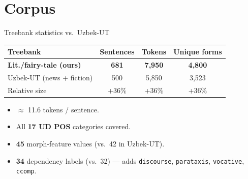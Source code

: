 \documentclass[10pt,aspectratio=169]{beamer}
\begin{document}
\section{Corpus}
\begin{frame}{Treebank statistics vs.\ Uzbek-UT}
   \centering
   \begin{tabular}{lccc}
      \toprule
      \textbf{Treebank} & \textbf{Sentences} & \textbf{Tokens} & \textbf{Unique forms}\\
      \midrule
      \textbf{Lit./fairy-tale (ours)} & \textbf{681}  & \textbf{7{,}950} & \textbf{4{,}800}\\
      Uzbek-UT (news + fiction)       & 500           & 5{,}850          & 3{,}523\\
      \midrule
      Relative size                   & +36\%         & +36\%            & +36\%\\
      \bottomrule
   \end{tabular}
   \vspace{0.8em}

   \begin{itemize}
      \item $\approx$ 11.6 tokens / sentence.
      \item All \textbf{17 UD POS} categories covered.
      \item \textbf{45} morph-feature values (vs.\ 42 in Uzbek-UT).
      \item \textbf{34} dependency labels (vs.\ 32) — adds \texttt{discourse}, \texttt{parataxis}, \texttt{vocative}, \texttt{ccomp}.
   \end{itemize}
\end{frame}
\end{document}

